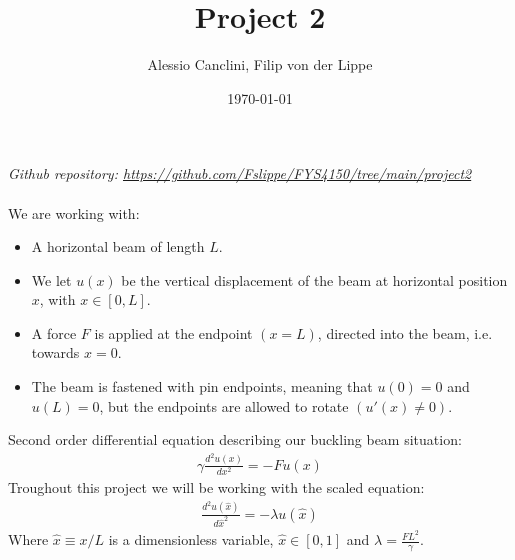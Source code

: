\documentclass[english,notitlepage]{revtex4-1}  %
\begin{document}
\title{Project 2}      
\author{Alessio Canclini, Filip von der Lippe}          
\date{\today}                             
\noaffiliation                            %


\maketitle

\textit{Github repository: \url{https://github.com/Fslippe/FYS4150/tree/main/project2}}
\\
\\
We are working with:
\begin{itemize}
    \item A horizontal beam of length $L$.
    
    \item We let $u(x)$ be the vertical displacement of the beam at horizontal position $x$, with $x \in [0,L]$.

    \item A force $F$ is applied at the endpoint $(x = L)$, directed into the beam, i.e. towards $x = 0$.
    
    \item The beam is fastened with pin endpoints, meaning that $u(0) = 0$ and $u(L) = 0$, but the endpoints are allowed to rotate $(u'(x) \neq 0)$.
\end{itemize}
Second order differential equation describing our buckling beam situation:
\begin{align}
    \gamma \frac{d^2u(x)}{dx^2} = - F u(x)
    \label{eq:diff}
\end{align}
Troughout this project we will be working with the scaled equation:
\begin{align}
    \frac{d^2u(\hat{x})}{d \hat{x}^2} = - \lambda u(\hat{x})
    \label{eq:scaled}
\end{align}
Where $\hat{x} \equiv x / L$ is a dimensionless variable, $\hat{x} \in [0,1]$ and $\lambda = \frac{FL^2}{\gamma}$.
\end{document}
